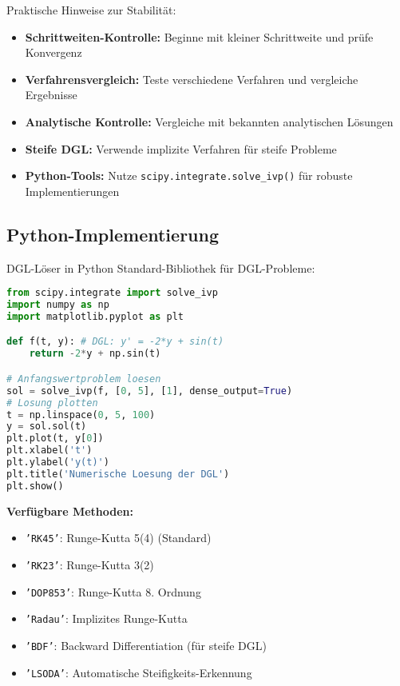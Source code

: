 \begin{theorem}{Praktische Hinweise zur Stabilität:}
\begin{itemize}
    \item \textbf{Schrittweiten-Kontrolle:} Beginne mit kleiner Schrittweite und prüfe Konvergenz
    \item \textbf{Verfahrensvergleich:} Teste verschiedene Verfahren und vergleiche Ergebnisse
    \item \textbf{Analytische Kontrolle:} Vergleiche mit bekannten analytischen Lösungen
    \item \textbf{Steife DGL:} Verwende implizite Verfahren für steife Probleme
    \item \textbf{Python-Tools:} Nutze \texttt{scipy.integrate.solve\_ivp()} für robuste Implementierungen
\end{itemize}
\end{theorem}

\subsection{Python-Implementierung}

\begin{code}{DGL-Löser in Python}
Standard-Bibliothek für DGL-Probleme:
\begin{lstlisting}[language=Python, style=basesmol]
from scipy.integrate import solve_ivp
import numpy as np
import matplotlib.pyplot as plt

def f(t, y): # DGL: y' = -2*y + sin(t)
    return -2*y + np.sin(t)

# Anfangswertproblem loesen
sol = solve_ivp(f, [0, 5], [1], dense_output=True)
# Losung plotten
t = np.linspace(0, 5, 100)
y = sol.sol(t)
plt.plot(t, y[0])
plt.xlabel('t')
plt.ylabel('y(t)')
plt.title('Numerische Loesung der DGL')
plt.show()
\end{lstlisting}

\textbf{Verfügbare Methoden:}
\begin{itemize}
    \item \texttt{'RK45'}: Runge-Kutta 5(4) (Standard)
    \item \texttt{'RK23'}: Runge-Kutta 3(2)
    \item \texttt{'DOP853'}: Runge-Kutta 8. Ordnung
    \item \texttt{'Radau'}: Implizites Runge-Kutta
    \item \texttt{'BDF'}: Backward Differentiation (für steife DGL)
    \item \texttt{'LSODA'}: Automatische Steifigkeits-Erkennung
\end{itemize}
\end{code}

